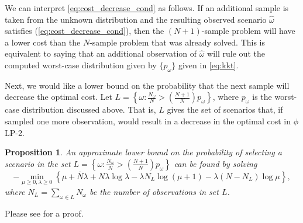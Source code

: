 \documentclass[11pt]{article}
\newtheorem{proposition}[theorem]{Proposition}
\newcommand{\plp}{$\phi$LP-2}
\begin{document}
We can interpret \eqref{eq:cost_decrease_cond} as follows. If an additional sample is taken from the unknown distribution and the resulting observed scenario $\hat{\omega}$ satisfies (\ref{eq:cost_decrease_cond}), then the $(N+1)$-sample problem will have a lower cost than the $N$-sample problem that was already solved.
This is equivalent to saying that an additional observation of $\hat{\omega}$ will rule out the computed worst-case distribution given by $\{p_\omega\}$ given in \eqref{eq:kkt}.

Next, we would like a lower bound on the probability that the next sample will decrease the optimal cost.
Let $L = \left\{ \omega : \frac{N_{\omega}}{N} > \left( \frac{N+1}{N} \right) p_\omega \right\}$, where $p_\omega$ is the worst-case distribution discussed above.
That is, $L$ gives the set of scenarios that, if sampled one more observation, would result in a decrease in the optimal cost in \plp.

\begin{proposition}
	An approximate lower bound on the probability of selecting a scenario in the set $L= \left\{ \omega : \frac{N_{\omega}}{N} > \left( \frac{N+1}{N} \right) p_\omega \right\}$ can be found by solving 
	\begin{equation} \label{eq:prob_cost_decrease}
		-\min_{\mu \geq 0,\lambda \geq 0} \left\{ \mu + \bar{N}\lambda + N\lambda\log\lambda - \lambda N_L \log(\mu + 1) - \lambda (N-N_L) \log\mu \right\},
	\end{equation}
	where $N_L = \sum_{\omega \in L} N_\omega$ be the number of observations in set $L$.
\end{proposition}

Please see \cite{love2013likelihood} for a proof.
\end{document}
